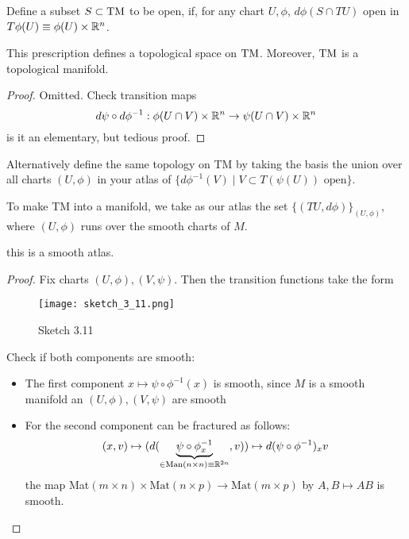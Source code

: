 Define a subset \(S\subset {\text{TM}}\) to be open, if, for any chart \(U,\phi\), \(d\phi(S\cap TU)\) open in \(T\phi(U)\equiv \phi(U)\times \mathbb{R}^n\). %
\begin{lemma}\label{lem:2.10}
    This prescription defines a topological space on \({\text{TM}}\). Moreover, \({\text{TM}}\) is a topological manifold.
\end{lemma}

\begin{proof}
    Omitted. Check transition maps 
    \[d\psi\circ d\phi^{-1}:\phi(U\cap V)\times \mathbb{R}^n\to \psi(U\cap V)\times \mathbb{R}^n\]
    is it an elementary, but tedious proof. 
\end{proof}

\begin{remark}
    Alternatively define the same topology on TM by taking the basis the union over all charts \((U,\phi)\) in your atlas 
    of \(\{d\phi^{-1}(V)\mid V\subset T(\psi(U)) \text{ open}\}\).
\end{remark}

To make TM into a  manifold, we take as our atlas the set \(\{(TU,d\phi)\}_{(U,\phi)}\),
where \((U,\phi)\) runs over the smooth charts of \(M\). 

\begin{lemma}\label{lem:3.11}
    this is a smooth atlas. 
\end{lemma}

\begin{proof}
    Fix charts \((U,\phi),(V,\psi)\). Then the transition functions take the form 
    \begin{figure}[H]
        \centering
        \texttt{[image: sketch\_3\_11.png]}
        \caption{Sketch 3.11}
    \end{figure}
    Check if both components are smooth:
    \begin{itemize}
        \item The first component \(x\mapsto \psi\circ\phi^{-1}(x)\) is smooth, since \(M\) is a smooth manifold an \((U,\phi),(V,\psi)\) are smooth  
        \item For the second component can be fractured as follows: \[(x,v)\mapsto (d(\underbrace{\psi\circ\phi^{-1}_x}_{\in\text{Man}(n\times n)\equiv\mathbb{R}^{2n}},v))\mapsto d(\psi\circ\phi^{-1})_xv\] 
         the map Mat\((m\times n)\times \text{Mat}(n\times p)\to \text{Mat}(m\times p)\) by \(A,B\mapsto AB\) is smooth. \qedhere
    \end{itemize}
\end{proof}

